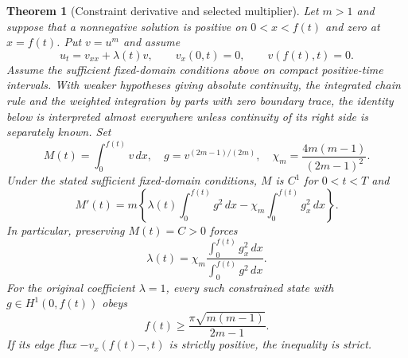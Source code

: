 \documentclass[11pt,a4paper]{article}
\newtheorem{theorem}{Theorem}[section]
\theoremstyle{remark}\newtheorem{remark}[theorem]{Remark}
\begin{document}
\begin{theorem}[Constraint derivative and selected multiplier]\label{thm:constraintderivative}
Let $m>1$ and suppose that a nonnegative solution is positive on
$0<x<f(t)$ and zero at $x=f(t)$. Put $v=u^m$ and assume
\[
 u_t=v_{xx}+\lambda(t)v,\qquad v_x(0,t)=0,
 \qquad v(f(t),t)=0.
\]
Assume the sufficient fixed-domain conditions above on compact
positive-time intervals. With weaker hypotheses giving absolute continuity,
the integrated chain rule and the weighted integration by parts with zero
boundary trace, the identity below is interpreted almost everywhere unless
continuity of its right side is separately known. Set
\[
 M(t)=\int_0^{f(t)}v\,dx,\quad
 g=v^{(2m-1)/(2m)},\quad
 \chi_m=\frac{4m(m-1)}{(2m-1)^2}.
\]
Under the stated sufficient fixed-domain conditions, $M$ is $C^1$
for $0<t<T$ and
\begin{equation}
 M'(t)=m\left\{\lambda(t)\int_0^{f(t)}g^2\,dx
                -\chi_m\int_0^{f(t)}g_x^2\,dx\right\}.
 \label{eq:constraintderivative}
\end{equation}
In particular, preserving $M(t)=C>0$ forces
\begin{equation}
 \lambda(t)=\chi_m
       \frac{\int_0^{f(t)}g_x^2\,dx}
            {\int_0^{f(t)}g^2\,dx}.
 \label{eq:selectedlambda}
\end{equation}
For the original coefficient $\lambda=1$, every such constrained state
with $g\in H^1(0,f(t))$ obeys
\begin{equation}
 f(t)\geq\frac{\pi\sqrt{m(m-1)}}{2m-1}.
 \label{eq:necessarywidth}
\end{equation}
If its edge flux $-v_x(f(t)-,t)$ is strictly positive, the inequality
is strict.
\end{theorem}
\end{document}
